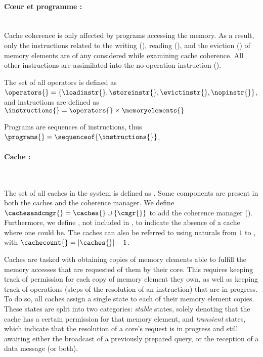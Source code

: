 \paragraph{C\oe{}ur et programme :}~~\\
Cache coherence is only affected by programs accessing the memory. As a result,
only the instructions related to the writing (\storeinstr{}), reading
(\loadinstr{}), and the eviction (\evictinstr{}) of memory elements are of any
considered while examining cache coherence. All other instructions are
assimilated into the no operation instruction (\nopinstr{}).

\begin{definition}[Instruction]
The set of all operators is defined as $\operators{} = \{\loadinstr{},
\storeinstr{}, \evictinstr{}, \nopinstr{}\}$, and instructions are defined
as $\instructions{} = \operators{} \times \memoryelements{}$
\end{definition}

\begin{definition}[Program]
Programs are sequences of instructions, thus $\programs{} =
\sequenceof{\instructions{}}$.
\end{definition}

\paragraph{Cache :}~~\\
\begin{definition}[Cache]
\label{fr:def:cache}
The set of all caches in the system is defined as \caches{}.  Some components
are present in both the caches and the coherence manager. We define
$\cachesandcmgr{} = \caches{} \cup \{\cmgr{}\}$ to add the coherence manager
(\cmgr{}). Furthermore, we define \nocache{}, not included in \caches{}, to
indicate the absence of a cache where one could be. The caches can also be
referred to using naturals from $1$ to \cachecount{}, with
$\cachecount{} = |\caches{}| - 1$.
\end{definition}

Caches are tasked with obtaining copies of memory elements able to fulfill the
memory accesses that are requested of them by their core. This requires keeping
track of permission for each copy of memory element they own, as well as
keeping track of operations (steps of the resolution of an instruction) that
are in progress. To do so, all caches assign a single state to each of their
memory element copies. These states are split into two categories:
\textit{stable} states, solely denoting that the cache has a certain permission
for that memory element, and \textit{transient} states, which indicate that the
resolution of a core's request is in progress and still awaiting either the
broadcast of a previously prepared query, or the reception of a data message
(or both).

